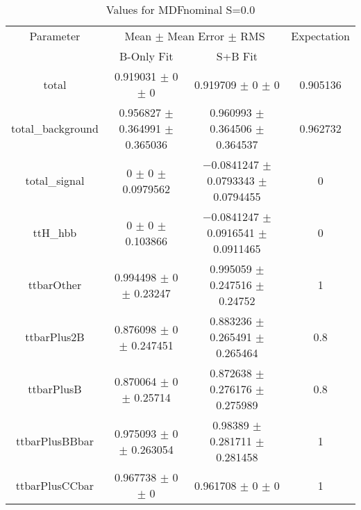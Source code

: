 \begin{table}
\centering
\caption{Values for MDFnominal S=0.0}
\begin{tabular}{cccc}
\toprule
Parameter & \multicolumn{2}{c}{Mean $\pm$ Mean Error $\pm$ RMS} & Expectation\\
 & B-Only Fit & S+B Fit & \\
\midrule
total & \num{0.919031} $\pm$ \num{0} $\pm$ \num{0} & \num{0.919709} $\pm$ \num{0} $\pm$ \num{0} & \num{0.905136}\\
total\_background & \num{0.956827} $\pm$ \num{0.364991} $\pm$ \num{0.365036} & \num{0.960993} $\pm$ \num{0.364506} $\pm$ \num{0.364537} & \num{0.962732}\\
total\_signal & \num{0} $\pm$ \num{0} $\pm$ \num{0.0979562} & \num{-0.0841247} $\pm$ \num{0.0793343} $\pm$ \num{0.0794455} & \num{0}\\
ttH\_hbb & \num{0} $\pm$ \num{0} $\pm$ \num{0.103866} & \num{-0.0841247} $\pm$ \num{0.0916541} $\pm$ \num{0.0911465} & \num{0}\\
ttbarOther & \num{0.994498} $\pm$ \num{0} $\pm$ \num{0.23247} & \num{0.995059} $\pm$ \num{0.247516} $\pm$ \num{0.24752} & \num{1}\\
ttbarPlus2B & \num{0.876098} $\pm$ \num{0} $\pm$ \num{0.247451} & \num{0.883236} $\pm$ \num{0.265491} $\pm$ \num{0.265464} & \num{0.8}\\
ttbarPlusB & \num{0.870064} $\pm$ \num{0} $\pm$ \num{0.25714} & \num{0.872638} $\pm$ \num{0.276176} $\pm$ \num{0.275989} & \num{0.8}\\
ttbarPlusBBbar & \num{0.975093} $\pm$ \num{0} $\pm$ \num{0.263054} & \num{0.98389} $\pm$ \num{0.281711} $\pm$ \num{0.281458} & \num{1}\\
ttbarPlusCCbar & \num{0.967738} $\pm$ \num{0} $\pm$ \num{0} & \num{0.961708} $\pm$ \num{0} $\pm$ \num{0} & \num{1}\\
\bottomrule
\end{tabular}
\end{table}